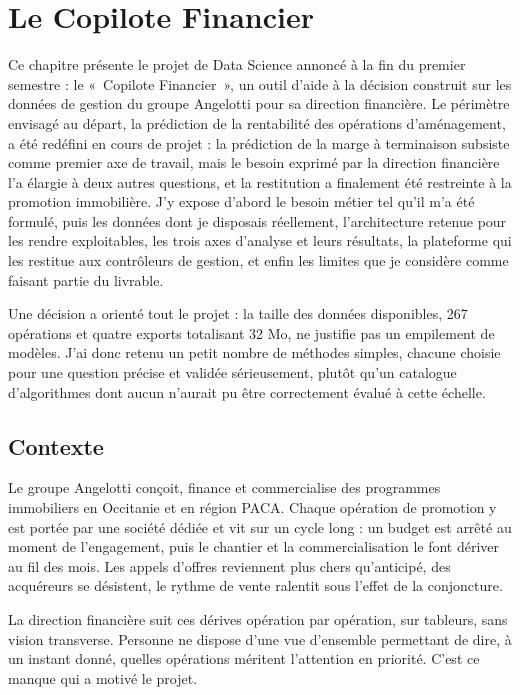 
\chapter{Le Copilote Financier}
\minitoc
\newpage

Ce chapitre présente le projet de Data Science annoncé à la fin du premier semestre : le
«~Copilote Financier~», un outil d'aide à la décision construit sur les données de gestion du
groupe Angelotti pour sa direction financière. Le périmètre envisagé au départ, la prédiction de
la rentabilité des opérations d'aménagement, a été redéfini en cours de projet : la prédiction
de la marge à terminaison subsiste comme premier axe de travail, mais le besoin exprimé par la
direction financière l'a élargie à deux autres questions, et la restitution a finalement été
restreinte à la promotion immobilière. J'y expose d'abord le besoin métier tel qu'il m'a été
formulé, puis les données dont je disposais réellement, l'architecture retenue pour les rendre
exploitables, les trois axes d'analyse et leurs résultats, la plateforme qui les restitue aux
contrôleurs de gestion, et enfin les limites que je considère comme faisant partie du livrable.

Une décision a orienté tout le projet : la taille des données disponibles, 267 opérations et
quatre exports totalisant 32 Mo, ne justifie pas un empilement de modèles. J'ai donc retenu un
petit nombre de méthodes simples, chacune choisie pour une question précise et validée
sérieusement, plutôt qu'un catalogue d'algorithmes dont aucun n'aurait pu être correctement
évalué à cette échelle.

\hypertarget{contexte}{%
\section{Contexte}\label{contexte}}

Le groupe Angelotti conçoit, finance et commercialise des programmes immobiliers en
Occitanie et en région PACA. Chaque opération de promotion y est portée par une société
dédiée et vit sur un cycle long : un budget est arrêté au moment de l'engagement, puis le
chantier et la commercialisation le font dériver au fil des mois. Les appels d'offres
reviennent plus chers qu'anticipé, des acquéreurs se désistent, le rythme de vente
ralentit sous l'effet de la conjoncture.

La direction financière suit ces dérives opération par opération, sur tableurs, sans vision
transverse. Personne ne dispose d'une vue d'ensemble permettant de dire, à un instant donné,
quelles opérations méritent l'attention en priorité. C'est ce manque qui a motivé le projet.

